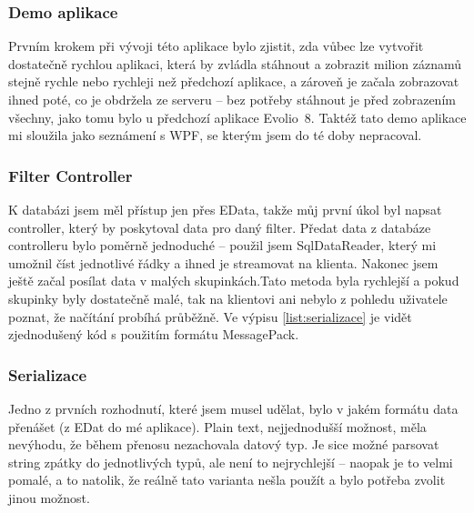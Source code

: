 \documentclass[czech,bachelorpractice,dept460,male,csharp]{diploma}
\newcommand{\EvolioEight}{Evolio~8}
\newcommand{\EData}{EData}
\begin{document}
		\subsubsection{Demo aplikace}
			Prvním krokem při vývoji této aplikace bylo zjistit, zda vůbec lze vytvořit dostatečně rychlou aplikaci, která by zvládla stáhnout a zobrazit milion záznamů stejně rychle nebo rychleji než předchozí aplikace, a zároveň je začala zobrazovat ihned poté, co je obdržela ze serveru – bez potřeby stáhnout je před zobrazením všechny, jako tomu bylo u předchozí aplikace {\EvolioEight}.
			Taktéž tato demo aplikace mi sloužila jako seznámení s WPF, se kterým jsem do té doby nepracoval.


		\subsubsection{Filter Controller}
			K databázi jsem měl přístup jen přes {\EData}, takže můj první úkol byl napsat controller, který by poskytoval data pro daný filter. Předat data z databáze controlleru bylo poměrně jednoduché -- použil jsem SqlDataReader, který mi umožnil číst jednotlivé řádky a ihned je streamovat na klienta. Nakonec jsem ještě začal posílat data v malých skupinkách.Tato metoda byla rychlejší a pokud skupinky byly dostatečně malé, tak na klientovi ani nebylo z pohledu uživatele poznat, že načítání probíhá průběžně.
			Ve výpisu \ref{list:serializace} je vidět zjednodušený kód s použitím formátu MessagePack.
			
		\subsubsection{Serializace}
			Jedno z prvních rozhodnutí, které jsem musel udělat, bylo v jakém formátu data přenášet (z EDat do mé aplikace). Plain text, nejjednodušší možnost, měla nevýhodu, že během přenosu nezachovala datový typ. Je sice možné parsovat string zpátky do jednotlivých typů, ale není to nejrychlejší -- naopak je to velmi pomalé, a to natolik, že reálně tato varianta nešla použít a bylo potřeba zvolit jinou možnost.
			
\end{document}
